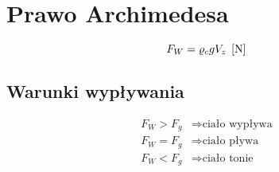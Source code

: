 \section{Prawo Archimedesa}
\begin{equation}
  F_W = \varrho_c g V_z \;\left[\mathrm{N}\right]
\end{equation}

\subsection{Warunki wypływania}
\begin{align*}
  F_W > F_g &\Rightarrow \text{ciało wypływa}\\
  F_W = F_g &\Rightarrow \text{ciało pływa}\\
  F_W < F_g &\Rightarrow \text{ciało tonie}
\end{align*}

